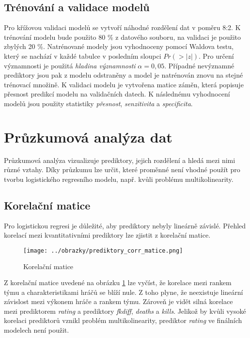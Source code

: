 \subsection{Trénování a validace modelů}
Pro křížovou validaci modelů se vytvoří náhodné rozdělení dat v poměru 8:2. K trénování modelu bude použito 80 \% z datového souboru, na validaci je použito zbylých 20 \%.
Natrénované modely jsou vyhodnoceny pomocí Waldova testu, který se nachází v každé tabulce v posledním sloupci $Pr(>|z|)$. Pro určení významnosti je použitá
\textit{hladina významnosti} $\alpha = 0,05$. Případné nevýznamné prediktory jsou pak z modelu odstraněny a model je natrénován znovu na stejné trénovací množině. K
validaci modelu je vytvořena matice záměn, která popisuje přesnost predikcí modelu na validačních datech. K následnému vyhodnocení modelů jsou použity statistiky
\textit{přesnost}, \textit{senzitivita} a \textit{specificita}. 

\newpage
\section{Průzkumová analýza dat}
Průzkumová analýza vizualizuje prediktory, jejich rozdělení a hledá mezi nimi různé vztahy. Díky průzkumu lze určit, které proměnné není vhodné použít pro tvorbu
logistického regresního modelu, např. kvůli problému multikolinearity.

\subsection{Korelační matice}
Pro logistickou regresi je důležité, aby prediktory nebyly lineárně závislé. Přehled korelací mezi kvantitativními prediktory lze zjistit z korelační matice.

\begin{figure}[H]
    \centering
    \texttt{[image: ../obrazky/prediktory\_corr\_matice.png]}
    \caption{Korelační matice} 
    \label{fig:korelacni_matice}
\end{figure}

Z korelační matice uvedené na obrázku \ref{fig:korelacni_matice} lze vyčíst, že korelace mezi rankem týmu a charakteristikami hráčů se blíží nule. Z toho plyne, že neexistuje
lineární závislost mezi výkonem hráče a rankem týmu. Zároveň je vidět silná korelace mezi prediktorem \textit{rating} a prediktory \textit{fkdiff}, \textit{deaths} a
\textit{kills}. Jelikož by kvůli vysoké korelaci prediktorů vznikl problém multikolinearity, prediktor \textit{rating} ve finálních modelech není použit.

